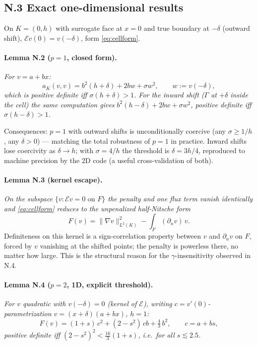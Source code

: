 \subsection*{N.3 Exact one-dimensional results}

On $K=(0,h)$ with surrogate face at $x=0$ and true boundary at $-\delta$
(outward shift), $\mathcal E v(0) = v(-\delta)$, form \eqref{eq:cellform}.

\paragraph{Lemma N.2 ($p=1$, closed form).} \emph{For $v = a + bx$:}
\[
  a_K(v,v) = b^2 (h+\delta) + 2bw + \sigma w^2, \qquad w := v(-\delta),
\]
\emph{which is positive definite iff $\sigma (h + \delta) > 1$. For the
inward shift ($\Gamma$ at $+\delta$ inside the cell) the same computation
gives $b^2(h-\delta) + 2bw + \sigma w^2$, positive definite iff
$\sigma (h - \delta) > 1$.}

Consequences: $p=1$ with outward shifts is unconditionally coercive (any
$\sigma \ge 1/h$, any $\delta > 0$) --- matching the total robustness of
$p=1$ in practice. Inward shifts lose coercivity as $\delta \to h$; with
$\sigma = 4/h$ the threshold is $\delta = 3h/4$, reproduced to machine
precision by the 2D code (a useful cross-validation of both).

\paragraph{Lemma N.3 (kernel escape).} \emph{On the subspace
$\{v : \mathcal E v = 0 \text{ on } F\}$ the penalty and one flux term
vanish identically and \eqref{eq:cellform} reduces to the
\emph{unpenalized half-Nitsche} form}
\[
  F(v) = \|\nabla v\|_{L^2(K)}^2 - \int_F (\partial_n v)\, v .
\]
Definiteness on this kernel is a sign-correlation property between $v$ and
$\partial_n v$ on $F$, forced by $v$ vanishing at the shifted points; the
penalty is powerless there, no matter how large. This is the structural
reason for the $\gamma$-insensitivity observed in N.4.

\paragraph{Lemma N.4 ($p=2$, 1D, explicit threshold).} \emph{For $v$
quadratic with $v(-\delta) = 0$ (kernel of $\mathcal E$), writing
$c = v'(0) $-parametrization $v = (x+\delta)(a+bx)$, $h=1$:}
\[
  F(v) = (1+s)\,c^2 + (2 - s^2)\,cb + \tfrac43\, b^2, \qquad c = a + bs,
\]
\emph{positive definite iff $(2-s^2)^2 < \tfrac{16}{3}(1+s)$, i.e.\ for all
$s \lesssim 2.5$.}

